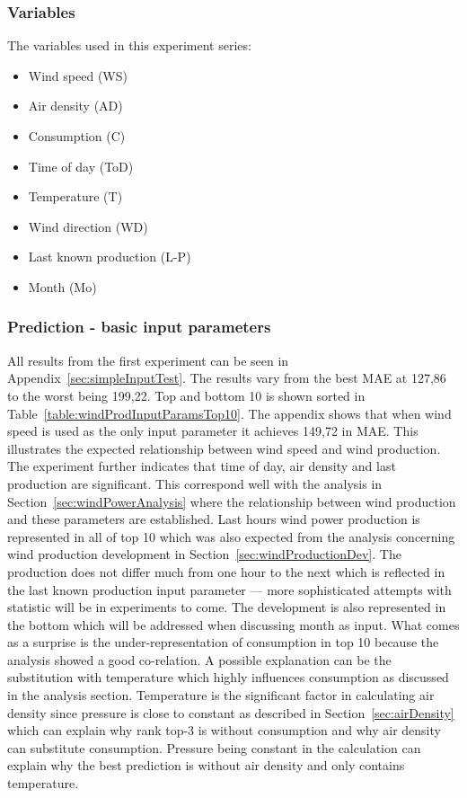 \subsubsection{Variables}
The variables used in this experiment series:

\begin{itemize}
\item Wind speed (WS)
\item Air density (AD)
\item Consumption (C)
\item Time of day (ToD)
\item Temperature (T)
\item Wind direction (WD)
\item Last known production (L-P)
\item Month (Mo)
\end{itemize}

\subsubsection{Prediction - basic input parameters}
\label{sec:predictionBasicInputParams}
All results from the first experiment can be seen in Appendix~\ref{sec:simpleInputTest}. The results vary from the best MAE at 127,86 to the worst being 199,22. Top and bottom 10 is shown sorted in Table~\ref{table:windProdInputParamsTop10}. The appendix shows that when wind speed is used as the only input parameter it achieves 149,72 in MAE. This illustrates the expected relationship between wind speed and wind production. The experiment further indicates that time of day, air density and last production are significant. This correspond well with the analysis in Section~\ref{sec:windPowerAnalysis} where the relationship between wind production and these parameters are established. Last hours wind power production is represented in all of top 10 which was also expected from the analysis concerning wind production development in Section~\ref{sec:windProductionDev}. The production does not differ much from one hour to the next which is reflected in the last known production input parameter --- more sophisticated attempts with statistic will be in experiments to come. The development is also represented in the bottom which will be addressed when discussing month as input. What comes as a surprise is the under-representation of consumption in top 10 because the analysis showed a good co-relation. A possible explanation can be the substitution with temperature which highly influences consumption as discussed in the analysis section. Temperature is the significant factor in calculating air density since pressure is close to constant as described in Section~\ref{sec:airDensity} which can explain why rank top-3 is without consumption and why air density can substitute consumption. Pressure being constant in the calculation can explain why the best prediction is without air density and only contains temperature.

